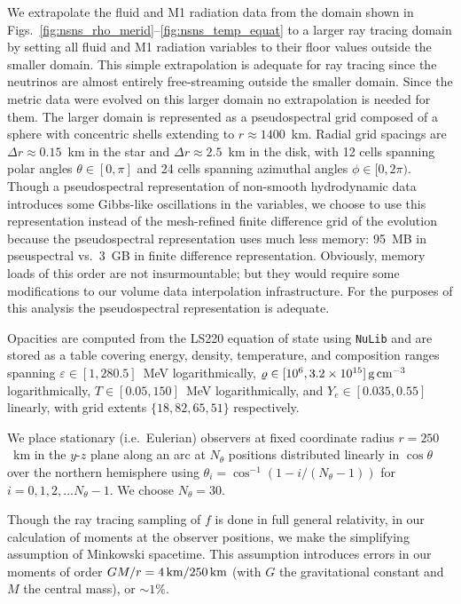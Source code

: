 \documentclass[aps,floatfix,prd,superscriptaddress,twocolumn]{revtex4-1}
\begin{document}
We extrapolate the fluid and M1 radiation data from
the domain shown in Figs.~\ref{fig:nsns_rho_merid}--\ref{fig:nsns_temp_equat}
to a larger ray tracing domain by setting all fluid and M1 radiation variables
to their floor values outside the smaller domain.
This simple extrapolation is adequate for ray tracing since
the neutrinos are almost entirely free-streaming outside the smaller domain.
Since the metric data were evolved on this larger domain no extrapolation is
needed for them.
The larger domain is represented as a pseudospectral grid
composed of a sphere with concentric shells extending to $r\approx1400$~km.
Radial grid spacings are $\Delta r \approx 0.15$~km in the star
and $\Delta r \approx 2.5$~km in the disk,
with 12 cells spanning polar angles $\theta\in[0,\pi]$
and 24 cells spanning azimuthal angles $\phi\in[0,2\pi)$.
Though a pseudospectral representation of non-smooth hydrodynamic data
introduces some Gibbs-like oscillations in the variables,
we choose to use this representation instead of the mesh-refined
finite difference grid of the evolution because the pseudospectral
representation uses much less memory:
95~MB in pseuspectral vs.\ 3~GB in finite difference representation.
Obviously, memory loads of this order are not insurmountable;
but they would require some modifications to our
volume data interpolation infrastructure.
For the purposes of this analysis the pseudospectral representation is adequate.

Opacities are computed from the LS220 equation of state using
\lstinline{NuLib} and are stored as a table covering
energy, density, temperature, and composition ranges
spanning $\varepsilon\in[1,280.5]$~MeV logarithmically,
$\varrho\in[10^6,3.2\times10^{15}]\,{\rm g}\,{\rm cm}^{-3}$ logarithmically,
$T\in[0.05,150]$~MeV logarithmically, and 
$Y_e\in[0.035,0.55]$ linearly,
with grid extents $\{18,82,65,51\}$ respectively.

We place stationary (i.e.\ Eulerian) observers at fixed coordinate radius
$r=250$~km in the $y$-$z$ plane along an arc at $N_\theta$ positions
distributed linearly in $\cos\theta$ over the northern hemisphere
using $\theta_i=\cos^{-1}\left(1-i/(N_\theta-1)\right)$
for $i=0,1,2,\ldots N_\theta-1$.
We choose $N_\theta=30$.

Though the ray tracing sampling of $f$ is done in full general relativity,
in our calculation of moments at the observer positions,
we make the simplifying assumption of Minkowski spacetime.
This assumption introduces errors in our moments of order
$GM/r=4\,{\rm km}/250\,{\rm km}$
(with $G$ the gravitational constant and $M$ the central mass),
or $\sim 1\%$.
\end{document}

